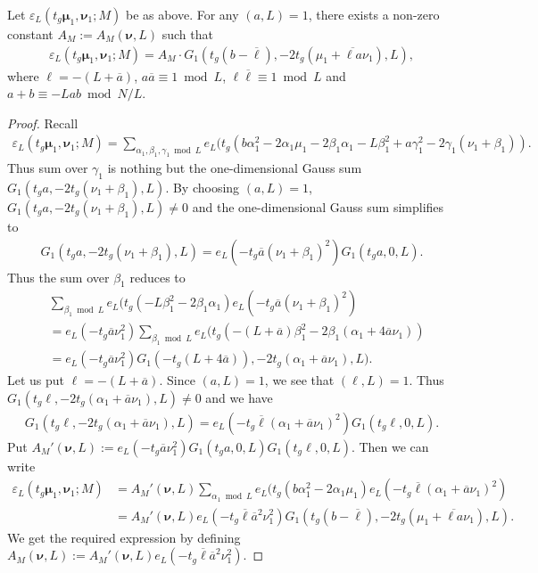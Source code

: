 \documentclass[11pt]{amsart}
\numberwithin{equation}{section}
\begin{document}
\begin{lemma}\label{lem:epsL}
    Let $\varepsilon_{L}(t_g\bm\mu_1, \bm\nu_1;M)$ be as above. For any $(a,L)=1$, there exists a  non-zero constant $A_M:=A_M(\bm\nu, L)$ such that
    \begin{align}
     \varepsilon_{L}(t_g\bm\mu_1, \bm\nu_1;M)=A_M  \cdot G_1(t_g(b-\overline{\ell}), -2t_g(\mu_1+\overline{\ell a}\nu_1), L), 
    \end{align}
where $\ell= -(L+\overline{a})$, $a\overline{a}\equiv 1\bmod L$, $\ell\overline{\ell}\equiv 1\bmod L$ and $a+b\equiv -Lab\bmod N/L$.
\end{lemma}
\begin{proof}
    Recall 
    \begin{align}
\varepsilon_{L}(t_g\bm\mu_1, \bm\nu_1;M)=\sum_{\alpha_1,\beta_1,\gamma_1\bmod L}e_L(t_g(b\alpha_1^2-2\alpha_1\mu_1-2\beta_1\alpha_1-L\beta_1^2+a\gamma_1^2-2\gamma_1(\nu_1+\beta_1)).    
\end{align}
Thus sum over $\gamma_1$ is nothing but the one-dimensional Gauss sum $G_1(t_ga, -2t_g(\nu_1+\beta_1), L)$. By choosing $(a, L)=1$, $G_1(t_ga, -2t_g(\nu_1+\beta_1), L)\neq 0$ and the one-dimensional Gauss sum simplifies to
\begin{align}
    G_1(t_ga, -2t_g(\nu_1+\beta_1), L)= e_L(-t_g\overline{a}(\nu_1+\beta_1)^2)G_1(t_ga, 0, L).
\end{align}
Thus the sum over $\beta_1$ reduces to
\begin{align}
    &\sum_{\beta_1\bmod L}e_L(t_g(-L\beta_1^2-2\beta_1\alpha_1)e_L(-t_g\overline{a}(\nu_1+\beta_1)^2)\\
    &= e_L(-t_g\overline{a}\nu_1^2)\sum_{\beta_1\bmod L}e_L(t_g(-(L+\overline{a})\beta_1^2-2\beta_1(\alpha_1+4\overline{a}\nu_1))\\
    &=e_L(-t_g\overline{a}\nu_1^2) G_1(-t_g(L+4\overline{a})), -2t_g(\alpha_1+\overline{a}\nu_1), L).
\end{align}
Let us put $\ell=-(L+\overline{a})$. Since $(a, L)=1$, we see that $(\ell, L)=1$. Thus $G_1(t_g\ell, -2t_g(\alpha_1+\overline{a}\nu_1), L)\neq 0$ and we have
\begin{align}
G_1(t_g\ell, -2t_g(\alpha_1+\overline{a}\nu_1), L)= e_L(-t_g\overline{\ell} (\alpha_1+\overline{a}\nu_1)^2) G_1(t_g\ell, 0, L).   
\end{align}
Put $A_M'(\bm \nu, L):=e_L(-t_g\overline{a}\nu_1^2)G_1(t_ga, 0, L) G_1(t_g\ell, 0, L)$. Then we can write
\begin{align}
 \varepsilon_{L}(t_g\bm\mu_1, \bm\nu_1;M)&=  A_M'(\bm \nu, L) \sum_{\alpha_1\bmod L}  e_L(t_g(b\alpha_1^2-2\alpha_1\mu_1)e_L(-t_g\overline{\ell} (\alpha_1+\overline{a}\nu_1)^2)\\
&=A_M'(\bm \nu, L)e_L(-t_g\overline{\ell}\overline{a}^2\nu_1^2) G_1(t_g(b-\overline{\ell}), -2t_g(\mu_1+\overline{\ell a}\nu_1), L).
\end{align}
We get the required expression by defining $A_M(\bm\nu, L):=A_M'(\bm \nu, L)e_L(-t_g\overline{\ell}\overline{a}^2\nu_1^2) $.
\end{proof}
\end{document}
